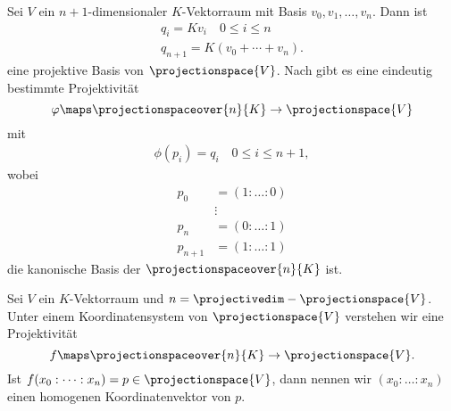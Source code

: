 Sei \( V \) ein \( n+1 \)-dimensionaler \( K \)-Vektorraum mit Basis \( v_0,v_1,\dotsc,v_n \). Dann ist
\begin{gather*}
  q_i=Kv_i\quad 0\leq i\leq n\\
  q_{n+1}=K(v_0+\dotsb+v_n).
\end{gather*}
eine projektive Basis von \( \projectionspace{V} \). Nach  gibt es eine eindeutig bestimmte Projektivität
\begin{equation*}
  \varphi\maps \projectionspaceover{n}{K}\to\projectionspace{V}
\end{equation*}
mit
\begin{gather*}
  \phi(p_i)=q_i \quad 0\leq i\leq n+1,
\end{gather*}
wobei
\begin{align*}
  p_0&=(1:\dotsc:0)\\
  &\vdots\\
  p_n&=(0:\dotsc:1)\\
  p_{n+1}&=(1:\dotsc:1)
\end{align*}
die kanonische Basis der \( \projectionspaceover{n}{K} \) ist.

\begin{definition*}
  Sei \( V \) ein \( K \)-Vektorraum und \( n=\projectivedim-{\projectionspace{V}} \). Unter einem Koordinatensystem von \( \projectionspace{V} \) verstehen wir eine Projektivität
  \begin{equation*}
    f\maps \projectionspaceover{n}{K}\to\projectionspace{V}.
  \end{equation*}
  Ist \( f(x_0:\dots:x_n)=p\in \projectionspace{V} \), dann nennen wir \( (x_0:\dotsc:x_n) \) einen homogenen Koordinatenvektor von \( p \).
\end{definition*}
